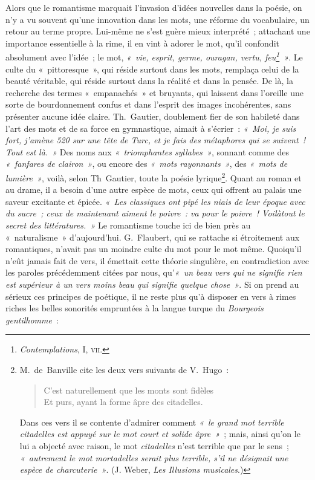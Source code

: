 \documentclass[french,twoside]{book} %
\begin{document}
Alors que le romantisme marquait l’invasion d’idées nouvelles dans la poésie, on n’y a vu souvent qu’une innovation dans les mots, une réforme du vocabulaire, un retour au terme propre. Lui-même ne s’est guère mieux interprété ; attachant une importance essentielle à la rime,  il en vint à adorer le mot, qu’il confondit absolument avec l’idée ; le mot, \emph{« vie, esprit, germe, ouragan, vertu, feu\footnote{\emph{Contemplations}, I, \textsc{vii}.} »}. Le culte du « pittoresque », qui réside surtout dans les mots, remplaça celui de la beauté véritable, qui réside surtout dans la réalité et dans la pensée. De là, la recherche des termes « empanachés » et bruyants, qui laissent dans l’oreille une sorte de bourdonnement confus et dans l’esprit des images incohérentes, sans présenter aucune idée claire. Th. Gautier, doublement fier de son habileté dans l’art des mots et de sa force en gymnastique, aimait à s’écrier : \emph{« Moi, je suis fort, j’amène 520 sur une tête de Turc, et je fais des métaphores qui se suivent ! Tout est là. »} Des noms aux \emph{« triomphantes syllabes »}, sonnant comme des \emph{« fanfares de clairon »}, ou encore des \emph{« mots rayonnants »}, des \emph{« mots de lumière »}, voilà, selon Th Gautier, toute la poésie lyrique\footnote{\noindent M. de Banville cite les deux vers suivants de V. Hugo :\par

\begin{verse}
C’est naturellement que les monts sont fidèles\\
Et purs, ayant la forme âpre des citadelles.\\
\end{verse}
\par
\noindent Dans ces vers il se contente d’admirer comment \emph{« le grand mot terrible \emph{citadelles} est appuyé sur le mot court et solide \emph{âpre} »} ; mais, ainsi qu’on le lui a objecté avec raison, le mot \emph{citadelles} n’est terrible que par le sens ; \emph{« autrement le mot \emph{mortadelles} serait plus terrible, s’il ne désignait une espèce de charcuterie »}. (J. Weber, \emph{Les Illusions musicales}.)
}. Quant au roman et au drame, il a besoin d’une autre espèce de mots, ceux qui offrent au palais une saveur excitante et épicée. \emph{« Les classiques ont pipé les niais de leur époque avec du sucre ; ceux de maintenant aiment le poivre : va pour le poivre !  Voilàtout le secret des littératures. »} Le romantisme touche ici de bien près au « naturalisme » d’aujourd’hui. G. Flaubert, qui se rattache si étroitement aux romantiques, n’avait pas un moindre culte du mot pour le mot même. Quoiqu’il n’eût jamais fait de vers, il émettait cette théorie singulière, en contradiction avec les paroles précédemment citées par nous, qu’\emph{« un beau vers qui ne signifie rien est supérieur à un vers moins beau qui signifie quelque chose »}. Si on prend au sérieux ces principes de poétique, il ne reste plus qu’à disposer en vers à rimes riches les belles sonorités empruntées à la langue turque du \emph{Bourgeois gentilhomme} :\par
\end{document}
